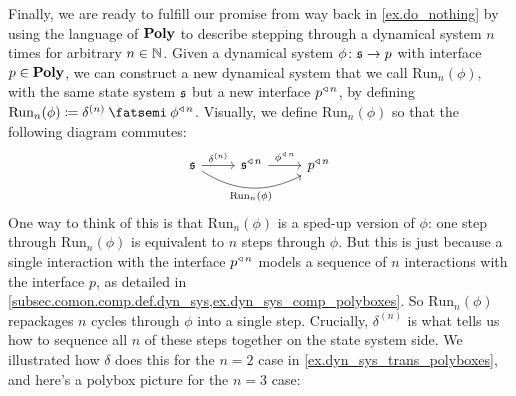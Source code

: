 \documentclass[Book-Poly]{subfiles}
\begin{document}
Finally, we are ready to fulfill our promise from way back in \cref{ex.do_nothing} by using the language of $\mathbf{Poly}$ to describe stepping through a dynamical system $n$ times for arbitrary $n\in\mathbb{N}$.
Given a dynamical system $\phi\colon\mathfrak{s}\to p$ with interface $p\in\mathbf{Poly}$, we can construct a new dynamical system that we call $\text{Run}_n(\phi)$, with the same state system $\mathfrak{s}$ but a new interface $p^{\mathbin{\triangleleft}\,n}$, by defining $\text{Run}_n(\phi)\coloneqq\delta^{(n)}\then\phi\tripow{n}$.
Visually, we define $\text{Run}_n(\phi)$ so that the following diagram commutes:
\begin{equation}\label{eqn.speedup}
\begin{tikzcd}
	\ema{s}\ar[r, "\delta^{(n)}"]\ar[rr, bend right, "{\text{Run}_n(\phi)}"']&
	\ema{s}\tripow{n}\ar[r, "\phi\tripow{n}"]&
	p\tripow n
\end{tikzcd}
\end{equation}
One way to think of this is that $\text{Run}_n(\phi)$ is a sped-up version of $\phi$: one step through $\text{Run}_n(\phi)$ is equivalent to $n$ steps through $\phi$.
But this is just because a single interaction with the interface $p^{\mathbin{\triangleleft}\,n}$ models a sequence of $n$ interactions with the interface $p$, as detailed in \cref{subsec.comon.comp.def.dyn_sys,ex.dyn_sys_comp_polyboxes}.
So $\text{Run}_n(\phi)$ repackages $n$ cycles through $\phi$ into a single step.
Crucially, $\delta^{(n)}$ is what tells us how to sequence all $n$ of these steps together on the state system side.
We illustrated how $\delta$ does this for the $n=2$ case in \cref{ex.dyn_sys_trans_polyboxes}, and here's a polybox picture for the $n=3$ case:
\end{document}
